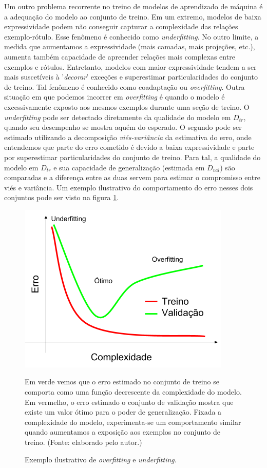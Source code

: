Um outro problema recorrente no treino de modelos de aprendizado de máquina é a adequação do modelo ao conjunto de treino. Em um extremo, modelos de baixa expressividade podem não conseguir capturar a complexidade das relações exemplo-rótulo. Esse fenômeno é conhecido como \textit{underfitting}. No outro limite, a medida que aumentamos a expressividade (mais camadas, mais projeções, etc.), aumenta também capacidade de apreender relações mais complexas entre exemplos e rótulos. Entretanto, modelos com maior expressividade tendem a ser mais suscetíveis à '\textit{decorar}' exceções e superestimar particularidades do conjunto de treino. Tal fenômeno é conhecido como coadaptação ou \textit{overfitting}. Outra situação em que podemos incorrer em \textit{overfitting} é quando o modelo é excessivamente exposto aos mesmos exemplos durante uma seção de treino. O \textit{underfitting} pode ser detectado diretamente da qualidade do modelo em $D_{tr}$, quando seu desempenho se mostra aquém do esperado. O segundo pode ser estimado utilizando a decomposição \textit{viés-variância} da estimativa do erro, onde entendemos que parte do erro cometido é devido a baixa expressividade e parte por superestimar particularidades do conjunto de treino. Para tal, a qualidade do modelo em $D_{tr}$ e sua capacidade de generalização (estimada em $D_{val}$) são comparadas e a diferença entre as duas servem para estimar o compromisso entre viés e variância. Um exemplo ilustrativo do comportamento do erro nesses dois conjuntos pode ser visto na figura \ref{overfit}.

\begin{figure}[ht]
	\caption{Exemplo ilustrativo de \textit{overfitting} e \textit{underfitting}.}
 	\begin{center}
	\includegraphics[width=.6\linewidth]{figuras/overfitting.png}
	\end{center}
	\small Em verde vemos que o erro estimado no conjunto de treino se comporta como uma função decrescente da complexidade do modelo. Em vermelho, o erro estimado o conjunto de validação mostra que existe um valor ótimo para o poder de generalização. Fixada a complexidade do modelo, experimenta-se um comportamento similar quando aumentamos a exposição aos exemplos no conjunto de treino. (Fonte: elaborado pelo autor.)
	\label{overfit}
\end{figure}

